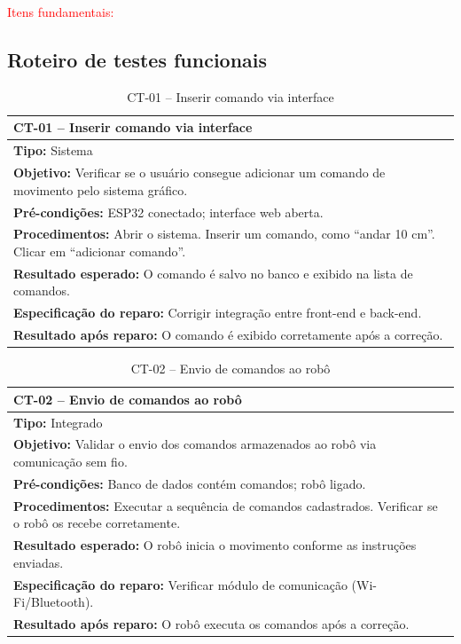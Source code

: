 \textcolor{red}{Itens fundamentais:}

\clearpage

\subsection{Roteiro de testes funcionais}

\begin{table}[H]
\centering
\begin{tabular}{|p{}|}
\hline
\textbf{CT-01 – Inserir comando via interface} \\ \hline
\textbf{Tipo:} Sistema \\ \hline
\textbf{Objetivo:} Verificar se o usuário consegue adicionar um comando de movimento pelo sistema gráfico. \\ \hline
\textbf{Pré-condições:} ESP32 conectado; interface web aberta. \\ \hline
\textbf{Procedimentos:} Abrir o sistema. Inserir um comando, como “andar 10 cm”. Clicar em “adicionar comando”. \\ \hline
\textbf{Resultado esperado:} O comando é salvo no banco e exibido na lista de comandos. \\ \hline
\textbf{Especificação do reparo:} Corrigir integração entre front-end e back-end. \\ \hline
\textbf{Resultado após reparo:} O comando é exibido corretamente após a correção. \\ \hline
\end{tabular}
\caption{CT-01 – Inserir comando via interface}
\end{table}


\begin{table}[H]
\centering
\begin{tabular}{|p{}|}
\hline
\textbf{CT-02 – Envio de comandos ao robô} \\ \hline
\textbf{Tipo:} Integrado \\ \hline
\textbf{Objetivo:} Validar o envio dos comandos armazenados ao robô via comunicação sem fio. \\ \hline
\textbf{Pré-condições:} Banco de dados contém comandos; robô ligado. \\ \hline
\textbf{Procedimentos:} Executar a sequência de comandos cadastrados. Verificar se o robô os recebe corretamente. \\ \hline
\textbf{Resultado esperado:} O robô inicia o movimento conforme as instruções enviadas. \\ \hline
\textbf{Especificação do reparo:} Verificar módulo de comunicação (Wi-Fi/Bluetooth). \\ \hline
\textbf{Resultado após reparo:} O robô executa os comandos após a correção. \\ \hline
\end{tabular}
\caption{CT-02 – Envio de comandos ao robô}
\end{table}

